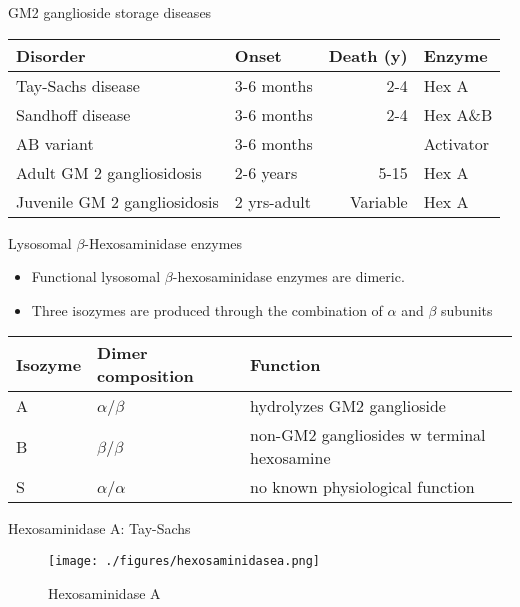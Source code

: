 \documentclass[presentation, smaller]{beamer}
\begin{document}
\begin{frame}[label={sec:orgheadline6}]{GM2 ganglioside storage diseases}
\begin{center}
\begin{tabular}{llrl}
Disorder & Onset & Death (y) & Enzyme\\
\hline
Tay-Sachs disease & 3-6 months & 2-4 & Hex A\\
Sandhoff disease & 3-6 months & 2-4 & Hex A\&B\\
AB variant & 3-6 months &  & Activator\\
Adult GM 2 gangliosidosis & 2-6 years & 5-15 & Hex A\\
Juvenile GM 2 gangliosidosis & 2 yrs-adult & Variable & Hex A\\
\end{tabular}
\end{center}
\end{frame}

\begin{frame}[label={sec:orgheadline7}]{Lysosomal \(\beta\)-Hexosaminidase enzymes}
\begin{itemize}
\item Functional lysosomal \(\beta\)-hexosaminidase enzymes are dimeric.
\item Three isozymes are produced through the combination of \(\alpha\)
  and \(\beta\) subunits
\end{itemize}

\begin{center}
\begin{tabular}{lll}
Isozyme & Dimer composition & Function\\
\hline
A & \(\alpha\)/\(\beta\) & hydrolyzes GM2 ganglioside\\
B & \(\beta\)/\(\beta\) & non-GM2 gangliosides w terminal hexosamine\\
S & \(\alpha\)/\(\alpha\) & no known physiological function\\
\end{tabular}
\end{center}
\end{frame}


\begin{frame}[label={sec:orgheadline8}]{Hexosaminidase A: Tay-Sachs}
\begin{figure}[htb]
\centering
\texttt{[image: ./figures/hexosaminidasea.png]}
\caption[hexa]{\label{fig:hexa}
Hexosaminidase A}
\end{figure}
\end{frame}
\end{document}
